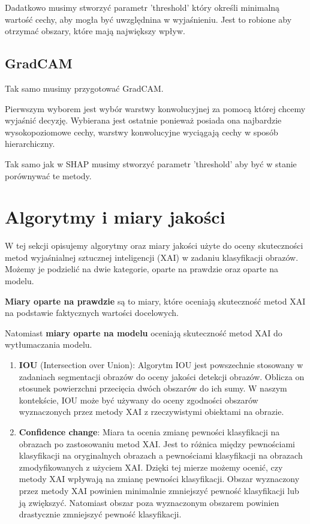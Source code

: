 Dadatkowo musimy stworzyć parametr 'threshold' który określi minimalną wartość cechy, aby mogła być uwzględnina w wyjaśnieniu.
Jest to robione aby otrzymać obszary, które mają największy wpływ.

\subsection*{GradCAM}
Tak samo musimy przygotować GradCAM.

Pierwszym wyborem jest wybór warstwy konwolucyjnej za pomocą której chcemy wyjaśnić decyzję.
Wybierana jest ostatnie ponieważ posiada ona najbardzie wysokopoziomowe cechy, warstwy konwolucyjne wyciągają cechy w sposób hierarchiczny.

Tak samo jak w SHAP musimy stworzyć parametr 'threshold' aby być w stanie porównywać te metody.

\section*{Algorytmy i miary jakości}

W tej sekcji opisujemy algorytmy oraz miary jakości użyte do oceny skuteczności metod wyjaśnialnej sztucznej inteligencji (XAI) w zadaniu klasyfikacji obrazów.
Możemy je podzielić na dwie kategorie, oparte na prawdzie oraz oparte na modelu.

\textbf{Miary oparte na prawdzie} są to miary, które oceniają skuteczność metod XAI na podstawie faktycznych wartości docelowych.

Natomiast \textbf{miary oparte na modelu} oceniają skuteczność metod XAI do wytłumaczania modelu.

\begin{enumerate}
	\item \textbf{IOU} (Intersection over Union): Algorytm IOU jest powszechnie stosowany w zadaniach segmentacji obrazów do oceny jakości detekcji obrazów.
	      Oblicza on stosunek powierzchni przecięcia dwóch obszarów do ich sumy.
	      W naszym kontekście, IOU może być używany do oceny zgodności obszarów wyznaczonych przez metody XAI z rzeczywistymi obiektami na obrazie.

	\item \textbf{Confidence change}: Miara ta ocenia zmianę pewności klasyfikacji na obrazach po zastosowaniu metod XAI.
	      Jest to różnica między pewnościami klasyfikacji na oryginalnych obrazach a pewnościami klasyfikacji na obrazach zmodyfikowanych z użyciem XAI.
	      Dzięki tej mierze możemy ocenić, czy metody XAI wpływają na zmianę pewności klasyfikacji.
	      Obszar wyznaczony przez metody XAI powinien minimalnie zmniejszyć pewność klasyfikacji lub ją zwiększyć.
	      Natomiast obszar poza wyznaczonym obszarem powinien drastycznie zmniejszyć pewność klasyfikacji.
\end{enumerate}

